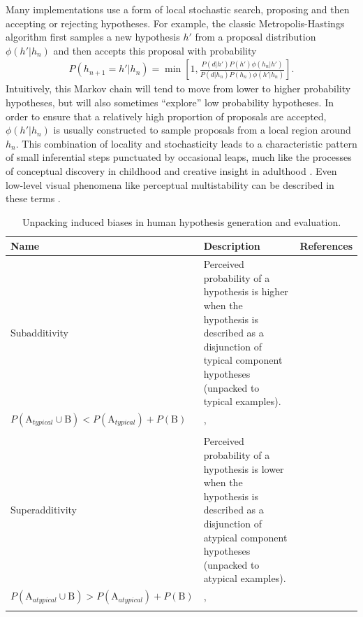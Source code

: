 Many implementations use a form of local stochastic search, proposing and then accepting or rejecting hypotheses. For example, the classic Metropolis-Hastings algorithm first samples a new hypothesis $h'$ from a proposal distribution $\phi(h'|h_n)$ and then accepts this proposal with probability
\begin{align}
P(h_{n+1}=h'|h_n) = \min\left[1, \frac{P(d|h')P(h') \phi(h_n|h')}{P(d|h_n)P(h_n) \phi(h'|h_n)}\right].
\label{eq:MH-step}
\end{align}
Intuitively, this Markov chain will tend to move from lower to higher probability hypotheses, but will also sometimes ``explore'' low probability hypotheses. In order to ensure that a relatively high proportion of proposals are accepted, $\phi(h'|h_n)$ is usually constructed to sample proposals from a local region around $h_n$. This combination of locality and stochasticity leads to a characteristic pattern of small inferential steps punctuated by occasional leaps, much like the processes of conceptual discovery in childhood \citep{ullman2012theory} and creative insight in adulthood \citep{suchow2017evolution}. Even low-level visual phenomena like perceptual multistability can be described in these terms \citep{gershman12,Moreno11}.


\begin{table}%
\centering
\caption{Unpacking induced biases in human hypothesis generation and evaluation.}
\label{tab:biases}
\begin{tabular}{p{}>{\raggedright}p{}p{}}
\toprule
\textbf{Name}&\textbf{Description}& \textbf{References}\\
\midrule
Subadditivity& Perceived probability of a hypothesis is higher when the hypothesis is described as a disjunction of typical component hypotheses (unpacked to typical examples). \\
$P (\text{A}_{typical} \cup \text{B}) < P (\text{A}_{typical}) + P(\text{B})$ & \citet{fox1998belief}, \citet{tversky94} \\\\
Superadditivity& Perceived probability of a hypothesis is lower when the hypothesis is described as a disjunction of atypical component hypotheses (unpacked to atypical examples). \\
$P (\text{A}_{atypical} \cup \text{B}) > P (\text{A}_{atypical}) + P(\text{B})$ & \citet{sloman04}, \citet{hadjichristidis1999opening} \\\\ 
\bottomrule
\end{tabular}
\end{table}

